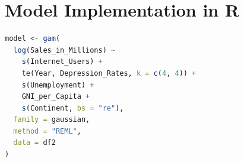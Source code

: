 \chapter{Model Implementation in R}
\begin{lstlisting}[language=R, caption={Model Specification}, label={lst:gam}]
model <- gam(
  log(Sales_in_Millions) ~
    s(Internet_Users) +
    te(Year, Depression_Rates, k = c(4, 4)) +
    s(Unemployment) +
    GNI_per_Capita +
    s(Continent, bs = "re"),
  family = gaussian,
  method = "REML",
  data = df2
)
\end{lstlisting}
